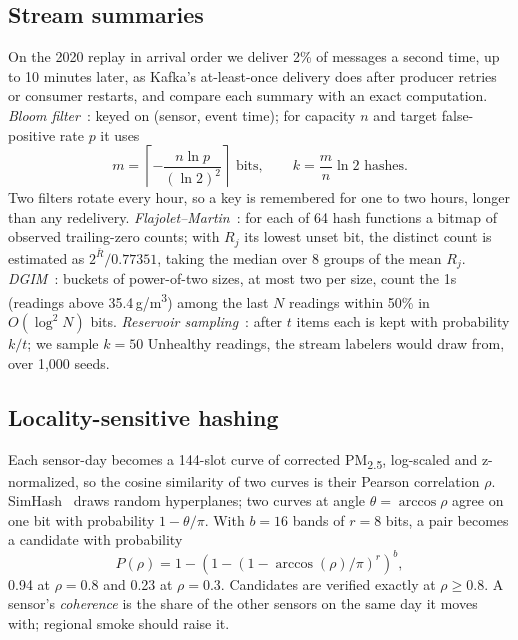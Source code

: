 \documentclass[10pt,journal,compsoc]{IEEEtran}
\newcommand{\ugm}{\,\textmu g/m\textsuperscript{3}}
\begin{document}
\subsection{Stream summaries}
On the 2020 replay in arrival order we deliver 2\% of messages a second time, up to 10 minutes later, as Kafka's at-least-once delivery does after producer retries or consumer restarts, and compare each summary with an exact computation.
\emph{Bloom filter}~\cite{bloom1970}: keyed on (sensor, event time); for capacity $n$ and target false-positive rate $p$ it uses
\begin{equation}
m = \left\lceil -\frac{n \ln p}{(\ln 2)^2} \right\rceil \text{ bits}, \qquad k = \frac{m}{n}\ln 2 \text{ hashes}.
\end{equation}
Two filters rotate every hour, so a key is remembered for one to two hours, longer than any redelivery. \emph{Flajolet--Martin}~\cite{flajolet1985}: for each of 64 hash functions a bitmap of observed trailing-zero counts; with $R_j$ its lowest unset bit, the distinct count is estimated as $2^{\bar R}/0.77351$, taking the median over 8 groups of the mean $R_j$. \emph{DGIM}~\cite{datar2002}: buckets of power-of-two sizes, at most two per size, count the 1s (readings above 35.4\ugm) among the last $N$ readings within 50\% in $O(\log^2 N)$ bits. \emph{Reservoir sampling}~\cite{vitter1985}: after $t$ items each is kept with probability $k/t$; we sample $k=50$ Unhealthy readings, the stream labelers would draw from, over 1,000 seeds.

\subsection{Locality-sensitive hashing}
Each sensor-day becomes a 144-slot curve of corrected PM\textsubscript{2.5}, log-scaled and z-normalized, so the cosine similarity of two curves is their Pearson correlation $\rho$. SimHash~\cite{charikar2002} draws random hyperplanes; two curves at angle $\theta = \arccos\rho$ agree on one bit with probability $1-\theta/\pi$. With $b=16$ bands of $r=8$ bits, a pair becomes a candidate with probability
\begin{equation}
P(\rho) = 1 - \left(1 - (1 - \arccos(\rho)/\pi)^{r}\right)^{b},
\end{equation}
0.94 at $\rho=0.8$ and 0.23 at $\rho=0.3$. Candidates are verified exactly at $\rho\ge0.8$. A sensor's \emph{coherence} is the share of the other sensors on the same day it moves with; regional smoke should raise it.
\end{document}
